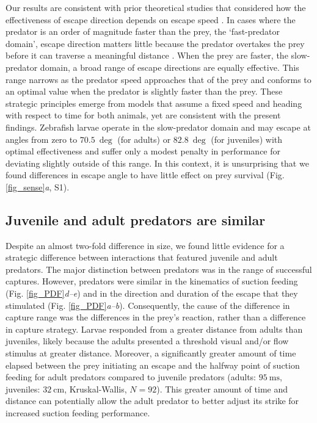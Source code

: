 \documentclass[]{rsos}%
\begin{document}
Our results are consistent with prior theoretical studies that considered how the effectiveness of escape direction depends on escape speed \cite{Isaacs:1965uz,Weihs:1984tb}.
In cases where the predator is an order of magnitude faster than the prey, the `fast-predator domain', escape direction matters little because the predator overtakes the prey before it can traverse a meaningful distance \cite{Soto:2015cj}.
When the prey are faster, the slow-predator domain, a broad range of escape directions are equally effective.
This range narrows as the predator speed approaches that of the prey and conforms to an optimal value when the predator is slightly faster than the prey.
These strategic principles emerge from models that assume a fixed speed and heading with respect to time for both animals, yet are consistent with the present findings. 
Zebrafish larvae operate in the slow-predator domain and may escape at angles from zero to $\SI{70.5}{\deg}$ (for adults) or $\SI{82.8}{\deg}$ (for juveniles) with optimal effectiveness \cite{Soto:2015cj} and suffer only a modest penalty in performance for deviating slightly outside of this range. 
In this context, it is unsurprising that we found differences in escape angle to have little effect on prey survival (Fig. \ref{fig_sense}\textit{a}, S1).

\subsection{Juvenile and adult predators are similar} 

Despite an almost two-fold difference in size, we found little evidence for a strategic difference between interactions that featured juvenile and adult predators.
The major distinction between predators was in the range of successful captures. 
However, predators were similar in the kinematics of suction feeding (Fig. \ref{fig_PDF}\textit{d--e}) and in the direction and duration of the escape that they stimulated (Fig. \ref{fig_PDF}\textit{a--b}).
Consequently, the cause of the difference in capture range was the differences in the prey's reaction, rather than a difference in capture strategy.
Larvae responded from a greater distance from adults than juveniles, likely because the adults presented a threshold visual and/or flow stimulus at greater distance.
Moreover, a significantly greater amount of time elapsed between the prey initiating an escape and the halfway point of suction feeding for adult predators compared to juvenile predators (adults: $\SI{95}{\ms}$, juveniles: $\SI{32}{\cm}$, Kruskal-Wallis, $N = 92$).
This greater amount of time and distance can potentially allow the adult predator to better adjust its strike for increased suction feeding performance.
\end{document}
